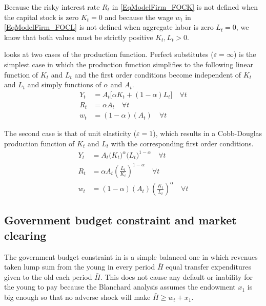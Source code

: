 \documentclass[letterpaper,12pt]{article}
\theoremstyle{definition}
\newcommand\ve{\varepsilon}
\begin{document}
    Because the risky interest rate $R_t$ in \eqref{EqModelFirm_FOCK} is not defined when the capital stock is zero $K_t=0$ and because the wage $w_t$ in \eqref{EqModelFirm_FOCL} is not defined when aggregate labor is zero $L_t=0$, we know that both values must be strictly positive $K_t, L_t>0$.

    \citet{Blanchard:2019} looks at two cases of the production function. Perfect substitutes ($\ve=\infty$) is the simplest case in which the production function simplifies to the following linear function of $K_t$ and $L_t$ and the first order conditions become independent of $K_t$ and $L_t$ and simply functions of $\alpha$ and $A_t$.
    \begin{align}
      Y_t &= A_t\bigl[\alpha K_t + (1 - \alpha)L_t\bigr] \quad\forall t \label{EqTAppBlanch_ProdFunc_infty} \\
      R_t &= \alpha A_t \quad\forall t \label{EqTAppBlanch_FOCK_infty} \\
      w_t &= (1 - \alpha)(A_t) \quad\forall t \label{EqTAppBlanch_FOCL_infty}
    \end{align}

    The second case is that of unit elasticity ($\ve=1$), which results in a Cobb-Douglas production function of $K_t$ and $L_t$ with the corresponding first order conditions.
    \begin{align}
      Y_t &= A_t\bigl(K_t\bigr)^\alpha\bigl(L_t\bigr)^{1-\alpha} \quad\forall t \label{EqTAppBlanch_ProdFunc_1} \\
      R_t &= \alpha A_t\left(\frac{L_t}{K_t}\right)^{1 - \alpha} \quad\forall t \label{EqTAppBlanch_FOCK_1} \\
      w_t &= (1 - \alpha)(A_t)\left(\frac{K_t}{L_t}\right)^\alpha \quad\forall t \label{EqTAppBlanch_FOCL_1}
    \end{align}

  \subsection{Government budget constraint and market clearing}\label{SecTAppBlanchGBCMC}

    The government budget constraint in \citet{Blanchard:2019} is a simple balanced one in which revenues taken lump sum from the young in every period $\bar{H}$ equal transfer expenditures given to the old each period $\bar{H}$. This does not cause any default or inability for the young to pay because the Blanchard analysis assumes the endowment $x_1$ is big enough so that no adverse shock will make $\bar{H}\geq w_t + x_1$.
\end{document}
